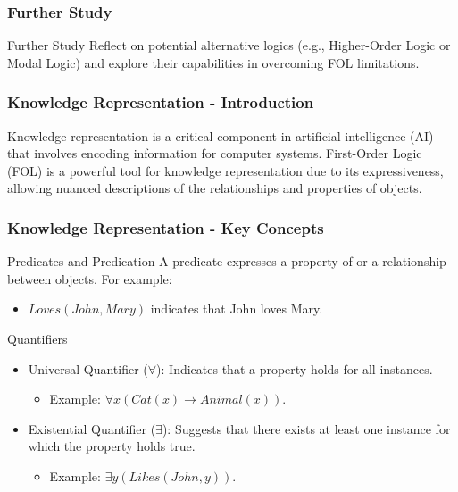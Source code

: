 \documentclass[aspectratio=169]{beamer}
\begin{document}
\begin{frame}[fragile]
    \frametitle{Further Study}
    \begin{block}{Further Study}
        Reflect on potential alternative logics (e.g., Higher-Order Logic or Modal Logic) and explore their capabilities in overcoming FOL limitations.
    \end{block}
\end{frame}

\begin{frame}[fragile]
    \frametitle{Knowledge Representation - Introduction}
    Knowledge representation is a critical component in artificial intelligence (AI) that involves encoding information for computer systems. 
    First-Order Logic (FOL) is a powerful tool for knowledge representation due to its expressiveness, allowing nuanced descriptions of the relationships and properties of objects.
\end{frame}

\begin{frame}[fragile]
    \frametitle{Knowledge Representation - Key Concepts}
    \begin{block}{Predicates and Predication}
        A predicate expresses a property of or a relationship between objects. 
        For example: 
        \begin{itemize}
            \item $Loves(John, Mary)$ indicates that John loves Mary.
        \end{itemize}
    \end{block}
    
    \begin{block}{Quantifiers}
        \begin{itemize}
            \item Universal Quantifier ($\forall$): Indicates that a property holds for all instances. 
                \begin{itemize}
                    \item Example: $\forall x (Cat(x) \rightarrow Animal(x))$.
                \end{itemize}
            \item Existential Quantifier ($\exists$): Suggests that there exists at least one instance for which the property holds true.
                \begin{itemize}
                    \item Example: $\exists y (Likes(John, y))$.
                \end{itemize}
        \end{itemize}
    \end{block}
\end{frame}
\end{document}
